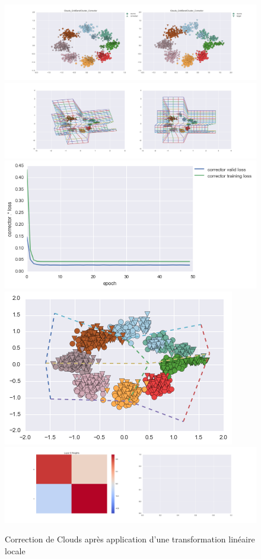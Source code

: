 \begin{figure}[H] %
\centering
\includegraphics[width=\linewidth]{fig/24-05-2016/clouds/Clouds_GridBendCluster_Corrector-DATA.png}
\includegraphics[width=\linewidth]{fig/24-05-2016/clouds/Clouds_GridBendCluster_Corrector-GridCheck.png}
\includegraphics[width=0.45\linewidth]{fig/24-05-2016/clouds/Clouds_GridBendCluster_Corrector-Learning_curve.png}
\includegraphics[width=0.45\linewidth]{fig/24-05-2016/clouds/cloud_grid.png}
\includegraphics[width=\linewidth]{fig/24-05-2016/clouds/Clouds_GridBendCluster_Corrector-W.png}
\caption{Correction de Clouds après application d'une transformation linéaire locale}
\label{fig:recap-clouds-GridBend-cluster}
\end{figure}

